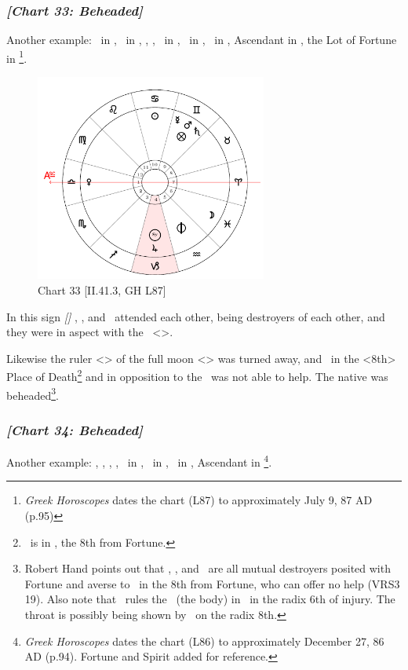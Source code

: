 \subsubsection{\textit{[Chart 33: Beheaded]}}
Another example: \Sun\, in \Cancer, \Moon\, in \Pisces, \Saturn, \Mars, \Mercury\, in \Gemini, \Jupiter\, in \Capricorn, \Venus\, in \Leo, Ascendant in \Libra, the Lot of Fortune in \Gemini
\footnote{\textit{Greek Horoscopes} dates the chart (L87) to approximately July 9, 87 AD (p.95)}.

\clearpage
\begin{figure}
\centering
\includegraphics[width=0.68\textwidth]{charts/2_41_3}
\caption{Chart 33 [II.41.3, GH L87]}
\label{fig:chart33}
\end{figure} 

In this sign \textsl{[\Gemini]} \Saturn, \Mercury, and \Mars\, attended each other, being destroyers of each other, and they were in aspect with the \Moon\, <\Square>. 

Likewise the ruler <\Saturn> of the full moon <\Capricorn> was turned away, and \Jupiter\, in the <8th> Place of Death\footnote{\Jupiter\, is in \Capricorn, the 8th from Fortune.} and in opposition to the \Sun\, was not able to help. The native was beheaded\footnote{Robert Hand points out that \Mercury, \Mars, and \Saturn\, are all mutual destroyers posited with Fortune and averse to \Jupiter\, in the 8th from Fortune, who can offer no help (VRS3 19). Also note that \Jupiter\, rules the \Moon\, (the body) in \Pisces\, in the radix 6th of injury. The throat is possibly being shown by \Taurus\, on the radix 8th.}.
\newpage
\subsubsection{\textit{[Chart 34: Beheaded]}}
Another example: \Sun, \Mercury, \Mars, \Jupiter, \Venus\, in \Capricorn, \Moon\, in \Aquarius, \Saturn\, in \Taurus, Ascendant in \Aries
\footnote{\textit{Greek Horoscopes} dates the chart (L86) to approximately December 27, 86 AD (p.94). Fortune and Spirit added for reference.}.


